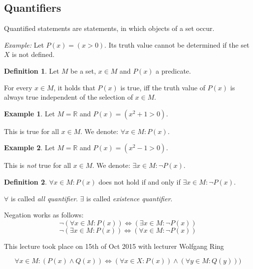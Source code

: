 \documentclass[a4paper,landscape,twocolumn]{article}
\theoremstyle{definition}
\newtheorem{defi}{Definition}
\newtheorem{ex}{Example}
\newcommand\meta[3]{\begin{mdframed}[skipbelow=4pt,skipabove=4pt,innermargin=1pt,innerleftmargin=1pt,innerrightmargin=1pt]\begin{center}\small{\textdownarrow{} This #1 took place on #2 with lecturer #3}\end{center}\end{mdframed}}
\begin{document}
\subsection{Quantifiers}
%
Quantified statements are statements, in which objects of a set occur.

\emph{Example:} Let $P(x) = (x > 0)$. Its truth value cannot be determined
if the set $X$ is not defined.

\begin{defi}
  Let $M$ be a set, $x \in M$ and $P(x)$ a predicate.

  For every $x \in M$, it holds that $P(x)$ is true,
  iff the truth value of $P(x)$ is always true independent of the selection of $x \in M$.
\end{defi}

\begin{ex}
  Let $M = \mathbb R$ and $P(x) = (x^2 + 1 > 0)$.

  This is true for all $x \in M$.
  We denote: $\forall x \in M: P(x)$.
\end{ex}

\begin{ex}
  Let $M = \mathbb R$ and $P(x) = (x^2 - 1 > 0)$.

  This is \emph{not} true for all $x \in M$.
  We denote: $\exists x \in M: \neg P(x)$.
\end{ex}

\begin{defi}
  $\forall x \in M: P(x)$ does not hold if and only if $\exists x \in M: \neg P(x)$.

  $\forall$ is called \emph{all quantifier}.
  $\exists$ is called \emph{existence quantifier}.

  Negation works as follows:
  \[ \neg\left(\forall x \in M: P(x)\right) \iff \left(\exists x \in M: \neg P(x)\right) \]
  \[ \neg\left(\exists x \in M: P(x)\right) \iff \left(\forall x \in M: \neg P(x)\right) \]
\end{defi}


\meta{lecture}{15th of Oct 2015}{Wolfgang Ring}

\[ \forall x \in M: (P(x) \land Q(x)) \iff (\forall x \in X: P(x)) \land (\forall y \in M: Q(y))) \]
\end{document}

